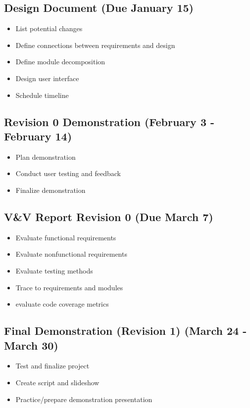 \documentclass{article}
\begin{document}
	\subsection{Design Document (Due January 15)}
	\begin{itemize}
		\item List potential changes
		\item Define connections between requirements and design
		\item Define module decomposition
		\item Design user interface
		\item Schedule timeline
	\end{itemize}

	\subsection{Revision 0 Demonstration (February 3 - February 14)}
	\begin{itemize}
		\item Plan demonstration 
		\item Conduct user testing and feedback 
		\item Finalize demonstration
	\end{itemize}

	\subsection{V\&V Report Revision 0 (Due March 7)}
	\begin{itemize}
		\item Evaluate functional requirements
		\item Evaluate nonfunctional requirements
		\item Evaluate testing methods
		\item Trace to requirements and modules
		\item evaluate code coverage metrics
	\end{itemize}

	\subsection{Final Demonstration (Revision 1) (March 24 - March 30)}
	\begin{itemize}
		\item Test and finalize project
		\item Create script and slideshow
		\item Practice/prepare demonstration presentation
	\end{itemize}
\end{document}
